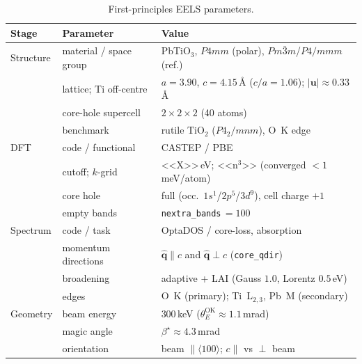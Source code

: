 \begin{table}[t]
  \centering
  \small
  \begin{tabular}{@{}lll@{}}
    \toprule
    Stage & Parameter & Value \\
    \midrule
    Structure & material / space group & PbTiO$_3$, $P4mm$ (polar), $Pm\bar{3}m$/$P4/mmm$ (ref.) \\
              & lattice; Ti off-centre  & $a{=}3.90$, $c{=}4.15$\,\AA{} ($c/a{=}1.06$); $|\mathbf{u}|{\approx}0.33$\,\AA \\
              & core-hole supercell     & $2\times2\times2$ (40 atoms) \\
              & benchmark               & rutile TiO$_2$ ($P4_2/mnm$), O~K edge \\
    \addlinespace
    DFT       & code / functional       & CASTEP \citep{Clark2005} / PBE \\
              & cutoff; $k$-grid         & <<X>>\,eV; <<n$^3$>> (converged $<1$\,meV/atom) \\
              & core hole               & full (occ.\ $1s^1$/$2p^5$/$3d^9$), cell charge $+1$ \\
              & empty bands             & \texttt{nextra\_bands}\,$=100$ \\
    \addlinespace
    Spectrum  & code / task             & OptaDOS \citep{Morris2014} / core-loss, absorption \\
              & momentum directions     & $\hat{\mathbf{q}}\!\parallel\!c$ and $\hat{\mathbf{q}}\!\perp\!c$ (\texttt{core\_qdir}) \\
              & broadening              & adaptive + LAI (Gauss $1.0$, Lorentz $0.5$\,eV) \\
              & edges                   & O~K (primary); Ti~L$_{2,3}$, Pb~M (secondary) \\
    \addlinespace
    Geometry  & beam energy             & $300$\,keV ($\theta_E^{\mathrm{OK}}\!\approx\!1.1$\,mrad) \\
              & magic angle             & $\beta^\star\!\approx\!4.3$\,mrad \\
              & orientation             & beam $\parallel\langle100\rangle$; $c\parallel$ vs $\perp$ beam \\
    \bottomrule
  \end{tabular}
  \caption{First-principles EELS parameters.}
  \label{tab:eels-params}
\end{table}
